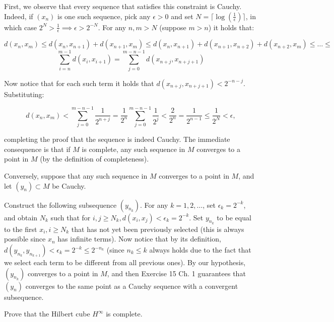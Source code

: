 \begin{solution}
    
    First, we observe that every sequence that satisfies this constraint is Cauchy.
    Indeed, if $(x_n)$ is one such sequence, pick any $\epsilon > 0$ and set $N = \lceil \log(\frac{1}{\epsilon}) \rceil$, in which case $2^N > \frac{1}{\epsilon} \implies \epsilon > 2^{-N}$.
    For any $n, m > N$ (suppose $m > n$) it holds that:

    \[d(x_n, x_m) \leq d(x_n, x_{n+1}) + d(x_{n+1}, x_m) \leq d(x_n, x_{n+1}) + d(x_{n + 1}, x_{n + 2}) + d(x_{n + 2}, x_m) \leq \ldots \leq\]
    \[\sum_{i = n}^{m - 1} d(x_i, x_{i+1}) = \sum_{j = 0}^{m - n - 1} d(x_{n + j}, x_{n + j + 1})\]

    Now notice that for each such term it holds that $d(x_{n + j}, x_{n + j + 1}) < 2^{-n - j}$.
    Substituting:

    \[d(x_n, x_m) < \sum_{j = 0}^{m - n - 1} \frac{1}{2^{n + j}} = \frac{1}{2^{n}} \sum_{j = 0}^{m - n - 1} \frac{1}{2^j} < \frac{2}{2^n} = \frac{1}{2^{n - 1}} \leq \frac{1}{2^N} < \epsilon,\]

    completing the proof that the sequence is indeed Cauchy.
    The immediate consequence is that if $M$ is complete, any such sequence in $M$ converges to a point in $M$ (by the definition of completeness).

    Conversely, suppose that any such sequence in $M$ converges to a point in $M$, and let $(y_n) \subset M$ be Cauchy.

    Construct the following subsequence $(y_{n_k})$.
    For any $k = 1, 2, \ldots$, set $\epsilon_k = 2^{-k}$, and obtain $N_k$ such that for $i, j \geq N_k, d(x_i, x_j) < \epsilon_k = 2^{-k}$.
    Set $y_{n_k}$ to be equal to the first $x_i, i \geq N_k$ that has not yet been previously selected (this is always possible since $x_n$ has infinite terms).
    Now notice that by its definition, $d(y_{n_k}, y_{n_{k+1}}) < \epsilon_k = 2^{-k} \leq 2^{-n_k}$ (since $n_k \leq k$ always holds due to the fact that we select each term to be different from all previous ones).
    By our hypothesis, $(y_{n_k})$ converges to a point in $M$, and then Exercise 15 Ch. 1 guarantees that $(y_n)$ converges to the same point as a Cauchy sequence with a convergent subsequence.
\end{solution}

\begin{exercise}{24}
    Prove that the Hilbert cube $H^{\infty}$ is complete.
\end{exercise}

